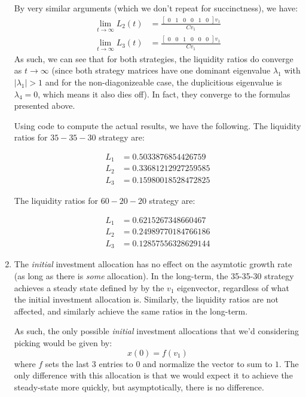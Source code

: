 \documentclass[12pt]{exam}
\begin{document}
\begin{questions}
\begin{solution}
\begin{enumerate}[label=(\alph*)]
        By very similar arguments (which we don't repeat for succinctness), we have:
        \begin{align*}
          \lim_{t \to \infty} L_2(t) &= \frac{\begin{bmatrix} 0 & 1 & 0 & 0 & 1 & 0 \end{bmatrix}v_1}{Cv_1} \\
          \lim_{t \to \infty} L_3(t) &= \frac{\begin{bmatrix} 0 & 0 & 1 & 0 & 0 & 0 \end{bmatrix}v_1}{Cv_1}
        \end{align*}
        As such, we can see that for both strategies, the liquidity ratios do converge as $t \to \infty$ (since both strategy matrices have one dominant eigenvalue $\lambda_1$ with $|\lambda_1| > 1$ and for the non-diagonizeable case, the duplicitious eigenvalue is $\lambda_4 = 0$, which means it also dies off). In fact, they converge to the formulas presented above.

        Using code to compute the actual results, we have the following.
        The liquidity ratios for $35-35-30$ strategy are:

        \begin{align*}
            L_1 &= 0.5033876854426759 \\
            L_2 &= 0.33681212927259585 \\
            L_3 &= 0.15980018528472825
        \end{align*}
                
        The liquidity ratios for $60-20-20$ strategy are:

        \begin{align*}
            L_1 &= 0.6215267348660467 \\
            L_2 &= 0.24989770184766186 \\
            L_3 &= 0.12857556328629144 
        \end{align*}
      \item The \textit{initial} investment allocation has no effect on the asymtotic growth rate (as long as there is \textit{some} allocation). In the long-term, the 35-35-30 strategy achieves a steady state defined by by the $v_1$ eigenvector, regardless of what the initial investment allocation is. Similarly, the liquidity ratios are not affected, and similarly achieve the same ratios in the long-term.

      As such, the only possible \textit{initial} investment allocations that we'd considering picking would be given by:
      \[
        x(0) = f(v_1)
      \]
      where $f$ sets the last 3 entries to $0$ and normalize the vector to sum to $1$. The only difference with this allocation is that we would expect it to achieve the steady-state more quickly, but asymptotically, there is no difference.
    \end{enumerate}
  \end{solution}



\end{questions}
\end{document}
